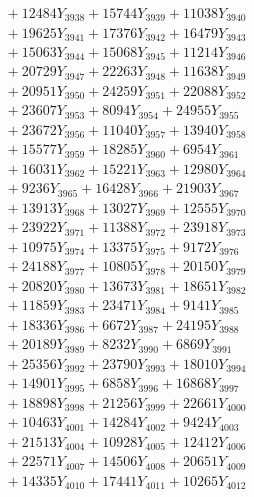 \documentclass[a4paper,10pt]{article}
\begin{document}
{\begin{align}
&\;  + 12484 Y_{3938} + 15744 Y_{3939} + 11038 Y_{3940} \\[0.3ex]
&\;  + 19625 Y_{3941} + 17376 Y_{3942} + 16479 Y_{3943} \\[0.3ex]
&\;  + 15063 Y_{3944} + 15068 Y_{3945} + 11214 Y_{3946} \\[0.3ex]
&\;  + 20729 Y_{3947} + 22263 Y_{3948} + 11638 Y_{3949} \\[0.3ex]
&\;  + 20951 Y_{3950} + 24259 Y_{3951} + 22088 Y_{3952} \\[0.3ex]
&\;  + 23607 Y_{3953} + 8094 Y_{3954} + 24955 Y_{3955} \\[0.3ex]
&\;  + 23672 Y_{3956} + 11040 Y_{3957} + 13940 Y_{3958} \\[0.5ex]\allowbreak
&\;  + 15577 Y_{3959} + 18285 Y_{3960} + 6954 Y_{3961} \\[0.3ex]
&\;  + 16031 Y_{3962} + 15221 Y_{3963} + 12980 Y_{3964} \\[0.3ex]
&\;  + 9236 Y_{3965} + 16428 Y_{3966} + 21903 Y_{3967} \\[0.3ex]
&\;  + 13913 Y_{3968} + 13027 Y_{3969} + 12555 Y_{3970} \\[0.3ex]
&\;  + 23922 Y_{3971} + 11388 Y_{3972} + 23918 Y_{3973} \\[0.3ex]
&\;  + 10975 Y_{3974} + 13375 Y_{3975} + 9172 Y_{3976} \\[0.3ex]
&\;  + 24188 Y_{3977} + 10805 Y_{3978} + 20150 Y_{3979} \\[0.3ex]
&\;  + 20820 Y_{3980} + 13673 Y_{3981} + 18651 Y_{3982} \\[0.3ex]
&\;  + 11859 Y_{3983} + 23471 Y_{3984} + 9141 Y_{3985} \\[0.3ex]
&\;  + 18336 Y_{3986} + 6672 Y_{3987} + 24195 Y_{3988} \\[0.5ex]\allowbreak
&\;  + 20189 Y_{3989} + 8232 Y_{3990} + 6869 Y_{3991} \\[0.3ex]
&\;  + 25356 Y_{3992} + 23790 Y_{3993} + 18010 Y_{3994} \\[0.3ex]
&\;  + 14901 Y_{3995} + 6858 Y_{3996} + 16868 Y_{3997} \\[0.3ex]
&\;  + 18898 Y_{3998} + 21256 Y_{3999} + 22661 Y_{4000} \\[0.3ex]
&\;  + 10463 Y_{4001} + 14284 Y_{4002} + 9424 Y_{4003} \\[0.3ex]
&\;  + 21513 Y_{4004} + 10928 Y_{4005} + 12412 Y_{4006} \\[0.3ex]
&\;  + 22571 Y_{4007} + 14506 Y_{4008} + 20651 Y_{4009} \\[0.3ex]
&\;  + 14335 Y_{4010} + 17441 Y_{4011} + 10265 Y_{4012} \\[0.3ex]

\end{align}}
\end{document}
